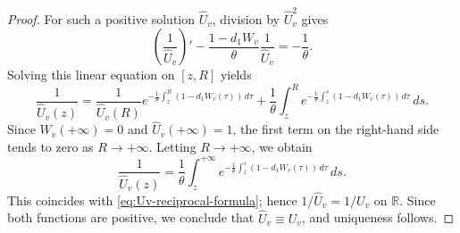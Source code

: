 \documentclass[10pt,a4paper]{amsart}
\begin{document}
\begin{proof}
For such a positive solution $\widehat U_v$, division by $\widehat U_v^2$ gives
\begin{equation*}
\left(\frac{1}{\widehat U_v}\right)'
-\frac{1-d_1W_v}{\theta}\frac{1}{\widehat U_v}
=-\frac{1}{\theta}.
\end{equation*}
Solving this linear equation on $[z,R]$ yields
\begin{equation*}
\frac{1}{\widehat U_v(z)}
=\frac{1}{\widehat U_v(R)}e^{-\frac{1}{\theta}\int_z^R(1-d_1W_v(\tau))\,d\tau}
+\frac{1}{\theta}\int_z^Re^{-\frac{1}{\theta}\int_z^s(1-d_1W_v(\tau))\,d\tau}\,ds.
\end{equation*}
Since $W_v(+\infty)=0$ and $\widehat U_v(+\infty)=1$, the first term on the right-hand side tends to zero as $R\to+\infty$. Letting $R\to+\infty$, we obtain
\begin{equation*}
\frac{1}{\widehat U_v(z)}=\frac{1}{\theta}\int_z^{+\infty}e^{-\frac{1}{\theta}\int_z^s(1-d_1W_v(\tau))\,d\tau}\,ds.
\end{equation*}
This coincides with \eqref{eq:Uv-reciprocal-formula}; hence
$1/\widehat U_v=1/U_v$ on $\mathbb R$. Since both functions are positive, we conclude that $\widehat U_v\equiv U_v$, and uniqueness follows.
\end{proof}
\end{document}
